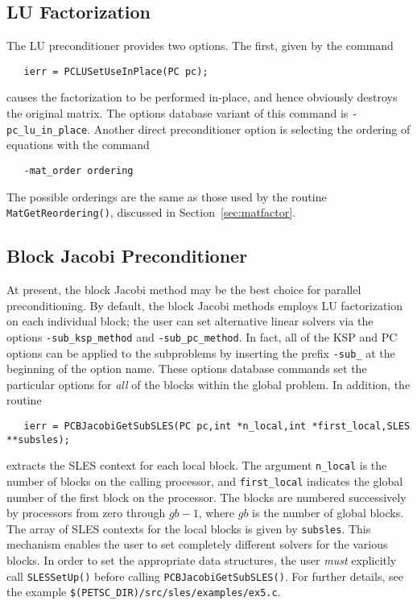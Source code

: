 
\subsection{LU Factorization}

The LU preconditioner provides two options.  The first, given by
the 
command  
\begin{verbatim}
   ierr = PCLUSetUseInPlace(PC pc);
\end{verbatim}
causes the factorization to be performed in-place, and hence
obviously destroys the original matrix.  The options database variant of
this command is {\tt -pc\_lu\_in\_place}. 
Another direct preconditioner option is selecting the ordering
of equations with the command 
\begin{verbatim}
   -mat_order ordering
\end{verbatim}
The possible orderings are the same as those used by the routine 
{\tt MatGetReordering()}, 
discussed in Section~\ref{sec:matfactor}.


\subsection{Block Jacobi Preconditioner}
\label{sec:bjacobi}

At present, the block Jacobi method   
may be the best choice for parallel preconditioning.  
By default, the block Jacobi methods employs LU factorization on each
individual block; the user can set alternative linear solvers via the options 
 
{\tt -sub\_ksp\_method} and {\tt -sub\_pc\_method}. In fact, all of the KSP
and PC options can be applied to the subproblems by inserting the prefix
{\tt -sub\_} at the beginning of the option name. 
These options database commands set the particular options for {\em all} 
of the blocks within the global problem.  In addition, the routine
\begin{verbatim}
   ierr = PCBJacobiGetSubSLES(PC pc,int *n_local,int *first_local,SLES **subsles);
\end{verbatim}
extracts the  SLES context for each local 
block.  The argument {\tt n\_local} is the number of blocks on the 
calling processor, and {\tt first\_local} indicates the global number 
of the first block on the processor. The blocks are numbered 
successively by processors from zero through $gb-1$, 
where $gb$ is the number of global blocks.  
The array of SLES contexts for the local blocks is given by {\tt subsles}. 
This mechanism enables the user to set completely different solvers for the 
various blocks.  In order to set the appropriate data structures, the 
user {\em must} explicitly call {\tt SLESSetUp()}  
before calling {\tt PCBJacobiGetSubSLES()}.  For further details, see the 
example {\tt \$(PETSC\_DIR)/src/sles/examples/ex5.c}.

